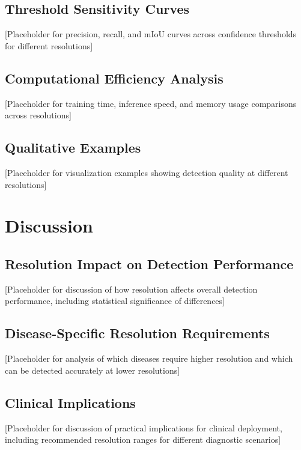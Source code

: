 \documentclass[10pt,twocolumn]{article}
\begin{document}
\subsection{Threshold Sensitivity Curves}

[Placeholder for precision, recall, and mIoU curves across confidence thresholds for different resolutions]

\subsection{Computational Efficiency Analysis}

[Placeholder for training time, inference speed, and memory usage comparisons across resolutions]

\subsection{Qualitative Examples}

[Placeholder for visualization examples showing detection quality at different resolutions]

\section{Discussion}

\subsection{Resolution Impact on Detection Performance}

[Placeholder for discussion of how resolution affects overall detection performance, including statistical significance of differences]

\subsection{Disease-Specific Resolution Requirements}

[Placeholder for analysis of which diseases require higher resolution and which can be detected accurately at lower resolutions]

\subsection{Clinical Implications}

[Placeholder for discussion of practical implications for clinical deployment, including recommended resolution ranges for different diagnostic scenarios]
\end{document}
